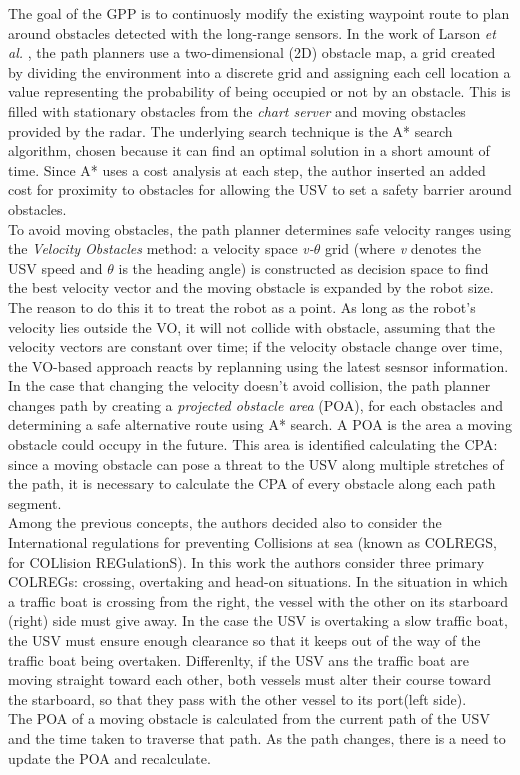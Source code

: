 \documentclass[journal]{IEEEtran}
\begin{document}
              The goal of the GPP is to continuosly modify the existing waypoint route to plan around obstacles detected with the long-range sensors. In the work of Larson \textit{et al.} \parencite{Larson2007,Larson2007a}, the path planners use a two-dimensional (2D) obstacle map, a grid created by dividing the environment into a discrete grid and assigning each cell location a value representing the probability of being occupied or not by an obstacle. This is filled with stationary obstacles from the \textit{chart server} and moving obstacles provided by the radar. The underlying search technique is the A* search algorithm, chosen because it can find an optimal solution in a short amount of time. Since A* uses a cost analysis at each step, the author inserted an added cost for proximity to obstacles for allowing the USV to set a safety barrier around obstacles.\\
              To avoid moving obstacles, the path planner determines safe velocity ranges using the \textit{Velocity Obstacles} method: a velocity space \textit{v-$\theta$} grid (where \textit{v} denotes the USV speed and \textit{$\theta$} is the heading angle) is constructed as decision space to find the best velocity vector and the moving obstacle is expanded by the robot size. The reason to do this it to treat the robot as a point. As long as the robot's velocity lies outside the VO, it will not collide with obstacle, assuming that the velocity vectors are constant over time; if the velocity obstacle change over time, the VO-based approach reacts by replanning using the latest sesnsor information.\\
              In the case that changing the velocity doesn't avoid collision, the path planner changes path by creating a \textit{projected obstacle area} (POA), for each obstacles and determining a safe alternative route using A* search. A POA is the area a moving obstacle could occupy in the future. This area is identified calculating the CPA: since a moving obstacle can pose a threat to the USV along multiple stretches of the path, it is necessary to calculate the CPA of every obstacle along each path segment.\\
              Among the previous concepts, the authors decided also to consider the International regulations for preventing Collisions at sea (known as COLREGS, for COLlision REGulationS). In this work the authors consider three primary COLREGs: crossing, overtaking and head-on situations. In the situation in which a traffic boat is crossing from the right, the vessel with the other on its starboard (right) side must give away. In the case the USV is overtaking a slow traffic boat, the USV must ensure enough clearance so that it keeps out of the way of the traffic boat being overtaken. Differenlty, if the USV ans the traffic boat are moving straight toward each other, both vessels must alter their course toward the starboard, so that they pass with the other vessel to its port(left side).\\
              The POA of a moving obstacle is calculated from the current path of the USV and the time taken to traverse that path. As the path changes, there is a need to update the POA and recalculate.
\end{document}
